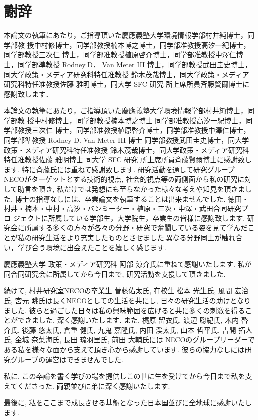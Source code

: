 \chapter*{謝辞}
\label{thanks}

本論文の執筆にあたり，ご指導頂いた慶應義塾大学環境情報学部村井純博士，同学部教
授中村修博士，同学部教授楠本博之博士，同学部准教授高汐一紀博士，同学部教授三次仁
博士，同学部准教授植原啓介博士，同学部准教授中澤仁博士，同学部準教授 Rodney D．
Van Meter III 博士，同学部教授武田圭史博士，同大学政策・メディア研究科特任准教授
鈴木茂哉博士，同大学政策・メディア研究科特任准教授佐藤 雅明博士，同大学 SFC 研究
所上席所員斉藤賢爾博士に感謝致します．


本論文の執筆にあたり，ご指導頂いた慶應義塾大学環境情報学部村井純博士，同学部教 授中村修博士，同学部教授楠本博之博士
同学部准教授高汐一紀博士，同学部教授三次仁 博士，同学部准教授植原啓介博士，同学部准教授中澤仁博士，同学部準教授 Rodney D. Van Meter III 博士
同学部教授武田圭史博士，同大学政策・メディア研究科特任准教授 鈴木茂哉博士，同大学政策・メディア研究科特任准教授佐藤 雅明博士
同大学 SFC 研究 所上席所員斉藤賢爾博士に感謝致します.
特に斉藤氏には重ねて感謝致します.
研究活動を通して研究グループNECOがターゲットとする技術的視点, 社会的視点等の両側面から私の研究に対して助言を頂き,
私だけでは発想にも至らなかった様々な考えや知見を頂きました. 博士の指導なしには、卒業論文を執筆することは出来ませんでした.
徳田・村井・楠本・中村・高汐・バンミーター・植原・三次・中澤・武田合同研究プロ ジェクトに所属している学部生，大学院生，卒業生の皆様に感謝致します.
研究会に所属する多くの方々が各々の分野・研究で奮闘している姿を見て学んだことが私の研究生活をより充実したものとさせました.異なる分野同士が触れ合い，学び合う環境に出会えたことを嬉しく感じます.

慶應義塾大学 政策・メディア研究科 阿部 涼介氏に重ねて感謝いたします. 私が同合同研究会に所属してから今日まで, 研究活動を支援して頂きました.

続けて, 村井研究室NECOの卒業生 菅藤佑太氏, 在校生 松本 光生氏, 風間 宏治氏, 宮元 眺氏は長くNECOとしての生活を共にし,
日々の研究生活の助けとなりました. 彼らと過ごした日々は私の興味範囲を広げると共に多くの刺激を得ることができました. 深く感謝いたします.
また, 梶原 留衣氏, 渡辺 聡紀氏, 木内 啓介氏, 後藤 悠太氏, 倉重 健氏, 九鬼 嘉隆氏,
内田 渓太氏, 山本 哲平氏, 吉開 拓人氏, 金城 奈菜海氏, 長田 琉羽里氏, 前田 大輔氏には
NECOのグループリーダーである私を様々な面から支えて頂き心から感謝しています. 彼らの協力なしには研究グループの運営はできませんでした.

私に, この卒論を書く学びの場を提供しこの世に生を受けてから今日まで私を支えてくださった. 両親並びに弟に深く感謝いたします.

最後に, 私をここまで成長させる基盤となった日本国並びに全地球に感謝いたします.


